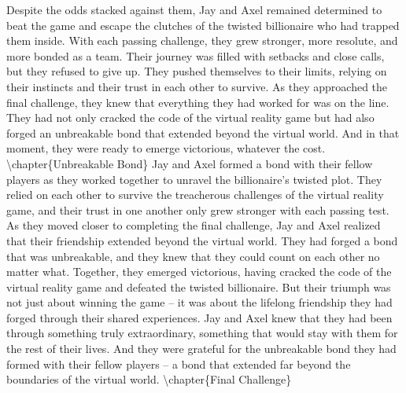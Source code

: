 \documentclass{book}%
\begin{document}
\newline%
Despite the odds stacked against them, Jay and Axel remained determined to beat the game and escape the clutches of the twisted billionaire who had trapped them inside. With each passing challenge, they grew stronger, more resolute, and more bonded as a team.\newline%
\newline%
Their journey was filled with setbacks and close calls, but they refused to give up. They pushed themselves to their limits, relying on their instincts and their trust in each other to survive.\newline%
\newline%
As they approached the final challenge, they knew that everything they had worked for was on the line. They had not only cracked the code of the virtual reality game but had also forged an unbreakable bond that extended beyond the virtual world. And in that moment, they were ready to emerge victorious, whatever the cost.%
\textbackslash{}chapter\{Unbreakable Bond\}\newline%
\newline%
Jay and Axel formed a bond with their fellow players as they worked together to unravel the billionaire's twisted plot. They relied on each other to survive the treacherous challenges of the virtual reality game, and their trust in one another only grew stronger with each passing test.\newline%
\newline%
As they moved closer to completing the final challenge, Jay and Axel realized that their friendship extended beyond the virtual world. They had forged a bond that was unbreakable, and they knew that they could count on each other no matter what.\newline%
\newline%
Together, they emerged victorious, having cracked the code of the virtual reality game and defeated the twisted billionaire. But their triumph was not just about winning the game – it was about the lifelong friendship they had forged through their shared experiences.\newline%
\newline%
Jay and Axel knew that they had been through something truly extraordinary, something that would stay with them for the rest of their lives. And they were grateful for the unbreakable bond they had formed with their fellow players – a bond that extended far beyond the boundaries of the virtual world.%
\textbackslash{}chapter\{Final Challenge\}\newline%
\end{document}
